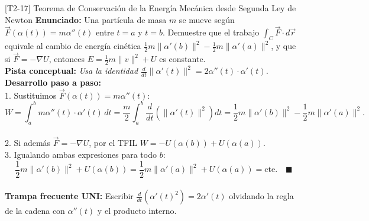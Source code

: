 \documentclass[11pt,a4paper]{article}
\begin{document}
\begin{ejerciciobox}{[T2-17] Teorema de Conservación de la Energía Mecánica desde Segunda Ley de Newton}
\textbf{Enunciado:} Una partícula de masa $m$ se mueve según $\vec{F}(\alpha(t)) = m\alpha''(t)$ entre $t=a$ y $t=b$. Demuestre que el trabajo $\int_C \vec{F}\cdot d\vec{r}$ equivale al cambio de energía cinética $\frac{1}{2}m\|\alpha'(b)\|^2 - \frac{1}{2}m\|\alpha'(a)\|^2$, y que si $\vec{F} = -\nabla U$, entonces $E = \frac{1}{2}m\|v\|^2 + U$ es constante.\\[0.2cm]
\textbf{Pista conceptual:} \emph{Usa la identidad $\frac{d}{dt}\|\alpha'(t)\|^2 = 2\alpha''(t)\cdot\alpha'(t)$.}\\[0.2cm]
\textbf{Desarrollo paso a paso:}\\
1. Sustituimos $\vec{F}(\alpha(t)) = m\alpha''(t)$:\\
$$W = \int_a^b m\alpha''(t)\cdot\alpha'(t)\,dt = \frac{m}{2}\int_a^b \frac{d}{dt}\left(\|\alpha'(t)\|^2\right)dt = \frac{1}{2}m\|\alpha'(b)\|^2 - \frac{1}{2}m\|\alpha'(a)\|^2.$$\\
2. Si además $\vec{F} = -\nabla U$, por el TFIL $W = -U(\alpha(b)) + U(\alpha(a))$.\\
3. Igualando ambas expresiones para todo $b$:\\
$$\frac{1}{2}m\|\alpha'(b)\|^2 + U(\alpha(b)) = \frac{1}{2}m\|\alpha'(a)\|^2 + U(\alpha(a)) = \text{cte}. \quad \blacksquare$$\\[0.2cm]
\textbf{Trampa frecuente UNI:} Escribir $\frac{d}{dt}(\alpha'(t)^2) = 2\alpha'(t)$ olvidando la regla de la cadena con $\alpha''(t)$ y el producto interno.
\end{ejerciciobox}
\end{document}
